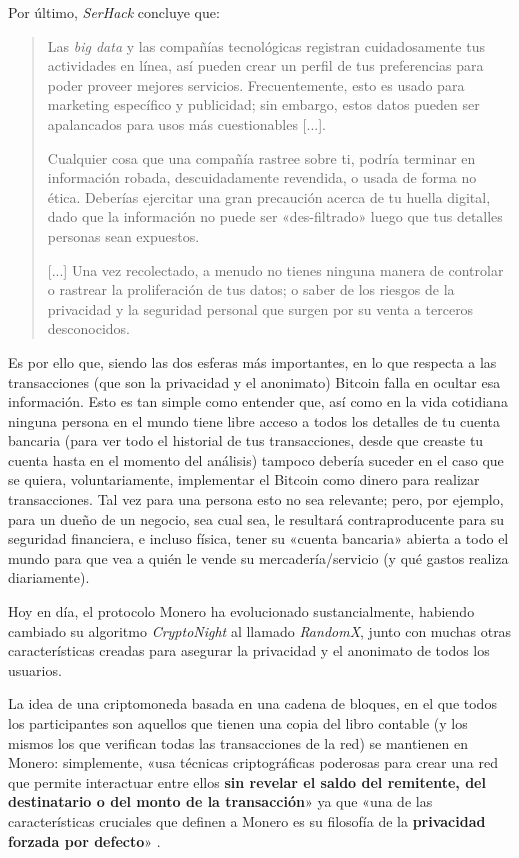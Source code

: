 \documentclass[12pt,a4paper,twoside]{book}
\begin{document}
Por último, \textit{SerHack} concluye que:

\begin{quotation}
Las \textit{big data} y las compañías tecnológicas registran cuidadosamente tus actividades en línea, así pueden crear un perfil de tus preferencias para poder proveer mejores servicios. Frecuentemente, esto es usado para marketing específico y publicidad; sin embargo, estos datos pueden ser apalancados para usos más cuestionables [...].

Cualquier cosa que una compañía rastree sobre ti, podría terminar en información robada, descuidadamente revendida, o usada de forma no ética. Deberías ejercitar una gran precaución acerca de tu huella digital, dado que la información no puede ser «des-filtrado» luego que tus detalles personas sean expuestos.

[...] Una vez recolectado, a menudo no tienes ninguna manera de controlar o rastrear la proliferación de tus datos; o saber de los riesgos de la privacidad y la seguridad personal que surgen por su venta a terceros desconocidos. \cite[págs. 23-24]{monero:master}
\end{quotation}

Es por ello que, siendo las dos esferas más importantes, en lo que respecta a las transacciones (que son la privacidad y el anonimato) Bitcoin falla en ocultar esa información. Esto es tan simple como entender que, así como en la vida cotidiana ninguna persona en el mundo tiene libre acceso a todos los detalles de tu cuenta bancaria (para ver todo el historial de tus transacciones, desde que creaste tu cuenta hasta en el momento del análisis) tampoco debería suceder en el caso que se quiera, voluntariamente, implementar el Bitcoin como dinero para realizar transacciones. Tal vez para una persona esto no sea relevante; pero, por ejemplo, para un dueño de un negocio, sea cual sea, le resultará contraproducente para su seguridad financiera, e incluso física, tener su «cuenta bancaria» abierta a todo el mundo para que vea a quién le vende su mercadería/servicio (y qué gastos realiza diariamente).

Hoy en día, el protocolo Monero ha evolucionado sustancialmente, habiendo cambiado su algoritmo \textit{CryptoNight} al llamado \textit{RandomX}, junto con muchas otras características creadas para asegurar la privacidad y el anonimato de todos los usuarios.

La idea de una criptomoneda basada en una cadena de bloques, en el que todos los participantes son aquellos que tienen una copia del libro contable (y los mismos los que verifican todas las transacciones de la red) se mantienen en Monero: simplemente, «usa técnicas criptográficas poderosas para crear una red que permite interactuar entre ellos \textbf{sin revelar el saldo del remitente, del destinatario o del monto de la transacción}» ya que «una de las características cruciales que definen a Monero es su filosofía de la \textbf{privacidad forzada por defecto}» \cite[págs. 25]{monero:master}.
\end{document}
